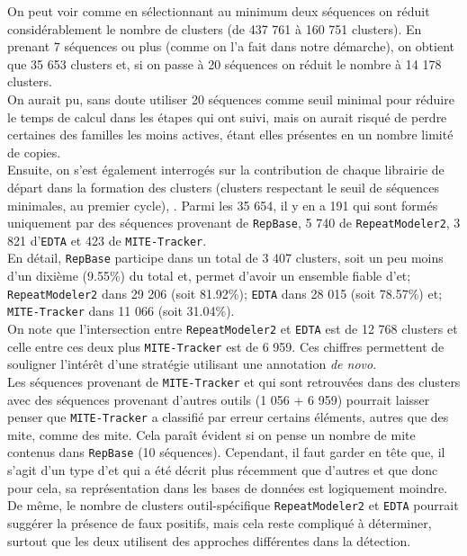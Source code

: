 \documentclass[10pt]{article}
\begin{document}
On peut voir comme en sélectionnant au minimum deux séquences on réduit considérablement le nombre de clusters (de 437 761 à 160 751 clusters). En prenant 7 séquences ou plus (comme on l'a fait dans notre démarche), on obtient que 35 653 clusters et, si on passe à 20 séquences on réduit le nombre à 14 178 clusters. \\
On aurait pu, sans doute utiliser 20 séquences comme seuil minimal pour réduire le temps de calcul dans les étapes qui ont suivi, mais on aurait risqué de perdre certaines des familles les moins actives, étant elles présentes en un nombre limité de copies.  \\

Ensuite, on s'est également interrogés sur la contribution de chaque librairie de départ dans la formation des clusters (clusters respectant le seuil de séquences minimales, au premier cycle), \figureautorefname{ \ref{fig:contribution}}. Parmi les 35 654, il y en a 191 qui sont formés uniquement par des séquences provenant de \texttt{RepBase}, 5 740 de \texttt{RepeatModeler2}, 3 821 d'\texttt{EDTA} et 423 de \texttt{MITE-Tracker}. \\
En détail, \texttt{RepBase} participe dans un total de 3 407 clusters, soit un peu moins d'un dixième (9.55\%) du total et, permet d'avoir un ensemble fiable d'\acrshort{et}; \texttt{RepeatModeler2} dans 29 206 (soit 81.92\%); \texttt{EDTA} dans 28 015 (soit 78.57\%) et; \texttt{MITE-Tracker} dans 11 066 (soit 31.04\%). \\
On note que l'intersection entre \texttt{RepeatModeler2} et \texttt{EDTA} est de 12 768 clusters et celle entre ces deux plus \texttt{MITE-Tracker} est de 6 959. Ces chiffres permettent de souligner l'intérêt d'une stratégie utilisant une annotation \textit{de novo}. \\
Les séquences provenant de \texttt{MITE-Tracker} et qui sont retrouvées dans des clusters avec des séquences provenant d'autres outils (1 056 + 6 959) pourrait laisser penser que \texttt{MITE-Tracker} a classifié par erreur certains éléments, autres que des \acrshort{mite}, comme des \acrshort{mite}. Cela paraît évident si on pense un nombre de \acrshort{mite} contenus dans \texttt{RepBase} (10 séquences). Cependant, il faut garder en tête que, il s'agit d'un type d'\acrshort{et} qui a été décrit plus récemment que d'autres et que donc pour cela, sa représentation dans les bases de données est logiquement moindre. \\
De même, le nombre de clusters outil-spécifique \texttt{RepeatModeler2} et \texttt{EDTA} pourrait suggérer la présence de faux positifs, mais cela reste compliqué à déterminer, surtout que les deux utilisent des approches différentes dans la détection.
\end{document}
